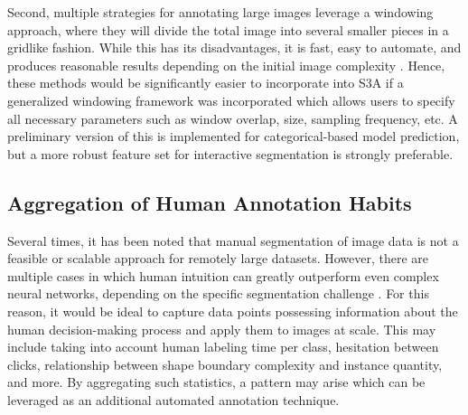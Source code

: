 Second, multiple strategies for annotating large images leverage a windowing approach, where they will divide the total image into several smaller pieces in a gridlike fashion.
While this has its disadvantages, it is fast, easy to automate, and produces reasonable results depending on the initial image complexity \citep{Vigueras_fullCnnCornealSegmentation}.
Hence, these methods would be significantly easier to incorporate into S3A if a generalized windowing framework was incorporated which allows users to specify all necessary parameters such as window overlap, size, sampling frequency, etc.
A preliminary version of this is implemented for categorical-based model prediction, but a more robust feature set for interactive segmentation is strongly preferable.

\subsection{Aggregation of Human Annotation Habits}
Several times, it has been noted that manual segmentation of image data is not a feasible or scalable approach for remotely large datasets.
However, there are multiple cases in which human intuition can greatly outperform even complex neural networks, depending on the specific segmentation challenge \citep{Russakovsky_humanCollabAnnotation2015}.
For this reason, it would be ideal to capture data points possessing information about the human decision-making process and apply them to images at scale.
This may include taking into account human labeling time per class, hesitation between clicks, relationship between shape boundary complexity and instance quantity, and more.
By aggregating such statistics, a pattern may arise which can be leveraged as an additional automated annotation technique.
